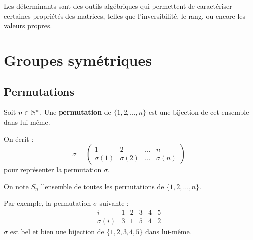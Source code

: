 \documentclass[12pt, a4paper]{report}
\begin{document}

\tableofcontents
\clearpage

\vspace*{\fill}
    Les déterminants sont des outils algébriques qui permettent de caractériser certaines propriétés des matrices, telles que l'inversibilité, le rang, ou encore les valeurs propres.
\vspace*{\fill}

\chapter{Groupes symétriques}

\section{Permutations}

\begin{definition}
    Soit $n \in \mathbb{N}^*$. Une \textbf{permutation} de $\{1, 2, \dots, n\}$ est une bijection de cet ensemble dans lui-même.

    On écrit :
    $$\sigma = \left(\begin{matrix} 1 & 2 & \dots & n \\ \sigma(1) & \sigma(2) & \dots & \sigma(n) \end{matrix}\right)$$
    pour représenter la permutation $\sigma$.

    On note $S_n$ l'ensemble de toutes les permutations de $\{1, 2, \dots, n\}$.
\end{definition}

\begin{example}[Permutation]
    Par exemple, la permutation $\sigma$ suivante :
    \[
        \begin{array}{c|ccccc}
            i & 1 & 2 & 3 & 4 & 5 \\
            \hline
            \sigma(i) & 3 & 1 & 5 & 4 & 2
        \end{array}
    \]
    $\sigma$ est bel et bien une bijection de $\{1, 2, 3, 4, 5\}$ dans lui-même.
\end{example}
\end{document}
